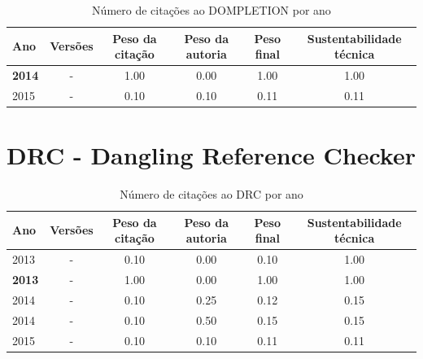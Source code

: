 \begin{table}[H]
\caption{Número de citações ao DOMPLETION por ano}
\centering
\begin{tabular}{| l | c | c | c | c | c |}
  \hline
  Ano & Versões & Peso da citação & Peso da autoria & Peso final & Sustentabilidade técnica \\
  \hline
            {\bf 2014}
          &
          -
          &
          1.00
          &
          0.00
          &
          1.00
          &
            {\color{blue} 1.00}
          \\
\hline
            2015
          &
          -
          &
          0.10
          &
          0.10
          &
          0.11
          &
            {\color{red} 0.11}
          \\
\hline
\end{tabular}
\end{table}



\section{DRC - Dangling Reference Checker}


\begin{table}[H]
\caption{Número de citações ao DRC  por ano}
\centering
\begin{tabular}{| l | c | c | c | c | c |}
  \hline
  Ano & Versões & Peso da citação & Peso da autoria & Peso final & Sustentabilidade técnica \\
  \hline
            2013
          &
          -
          &
          0.10
          &
          0.00
          &
          0.10
          &
            {\color{blue} 1.00}
          \\
            {\bf 2013}
          &
          -
          &
          1.00
          &
          0.00
          &
          1.00
          &
            {\color{blue} 1.00}
          \\
\hline
            2014
          &
          -
          &
          0.10
          &
          0.25
          &
          0.12
          &
            {\color{red} 0.15}
          \\
            2014
          &
          -
          &
          0.10
          &
          0.50
          &
          0.15
          &
            {\color{red} 0.15}
          \\
\hline
            2015
          &
          -
          &
          0.10
          &
          0.10
          &
          0.11
          &
            {\color{red} 0.11}
          \\
\hline
\end{tabular}
\end{table}



